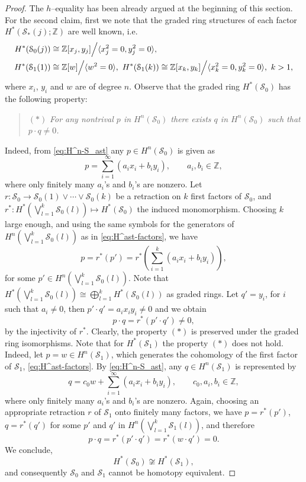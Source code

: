 \documentclass[reqno,12pt]{amsart}
\theoremstyle{ourremark}
\numberwithin{equation}{section}
\numberwithin{theorem}{section}
\begin{document}
\begin{proof}
The $h$--equality has been already argued at the beginning of this section. For the second claim, first we note that the graded ring structures of each factor $H^\ast(\mathcal{S}_\ast(j);{\mathbb{Z}})$ are well known, i.e.
\begin{equation}\label{eq:H^ast-factors}
\begin{split}
 H^\ast(\mathcal{S}_0(j)) & \cong {\mathbb{Z}}[x_j,y_j]\Bigl/\langle x^2_j=0, y^2_j=0\rangle,\\
 H^\ast(\mathcal{S}_1(1)) & \cong {\mathbb{Z}}[w]\Bigl/\langle w^2=0\rangle,\ H^\ast(\mathcal{S}_1(k))  \cong {\mathbb{Z}}[x_k,y_k]\Bigl/\langle x^2_k=0, y^2_k=0\rangle,\ k>1,
\end{split}
\end{equation}
where $x_i$, $y_i$ and $w$ are of degree $n$. Observe that the graded ring $H^\ast(\mathcal{S}_0)$ has the following property: 
\begin{quote}
$(\ast)$ {\em For any nontrival  $p$ in $H^n(\mathcal{S}_0)$  there exists $q$  in $H^n(\mathcal{S}_0)$ such that $p\cdot q\neq 0$.}
\end{quote}
{\noindent} Indeed, from \eqref{eq:H^n-S_ast} any $p\in H^n(\mathcal{S}_0)$ is given as 
\[
 p=\sum^\infty_{i=1} (a_i x_i+b_i y_i),\qquad a_i,b_i\in {\mathbb{Z}},
\]
where only finitely many $a_i$'s and $b_i$'s are nonzero. Let $r:\mathcal{S}_0\longrightarrow \mathcal{S}_0(1)\vee\cdots \vee \mathcal{S}_0(k)$ be a retraction on $k$ first factors of $\mathcal{S}_0$, and $r^\ast:H^\ast(\bigvee^k_{l=1} \mathcal{S}_0(l))\longmapsto H^\ast(\mathcal{S}_0)$ the induced monomorphism. Choosing $k$ large enough, and using the same symbols for the generators of $H^n(\bigvee^k_{l=1} \mathcal{S}_0(l))$ as in \eqref{eq:H^ast-factors}, we have
\[
 p=r^\ast(p')=r^\ast(\sum^k_{i=1} (a_i x_i+b_i y_i)), 
\]
for some $p'\in H^n(\bigvee^k_{l=1} \mathcal{S}_0(l))$. Note that $H^\ast(\bigvee^k_{l=1} \mathcal{S}_0(l))\cong \bigoplus^k_{l=1} H^\ast(\mathcal{S}_0(l))$ as graded rings.
Let $q'=y_i$, for $i$ such that $a_i\neq 0$, then $p'\cdot q'=a_i x_i y_i\neq 0$  and we obtain
\[
p\cdot q=r^\ast(p'\cdot q')\neq 0,
\]
by the injectivity of $r^\ast$. Clearly, the property $(\ast)$ is preserved under the graded ring isomorphisms.
 Note that for $H^\ast(\mathcal{S}_1)$ the property $(\ast)$ does not hold.
Indeed, let $p=w\in H^n(\mathcal{S}_1)$, which generates the cohomology of the first factor of $\mathcal{S}_1$, \eqref{eq:H^ast-factors}. By \eqref{eq:H^n-S_ast}, any $q\in H^n(\mathcal{S}_1)$ is represented by
\[
 q=c_0 w+\sum^\infty_{i=1} (a_i x_i+b_i y_i),\qquad c_0,a_i,b_i\in {\mathbb{Z}},
\]
where only finitely many $a_i$'s and $b_i$'s are nonzero. Again, choosing an appropriate retraction $r$ of $\mathcal{S}_1$ onto finitely many factors,  we have $p=r^\ast(p')$, $q=r^\ast(q')$ for some $p'$ and $q'$ in $H^n(\bigvee^k_{l=1} \mathcal{S}_1(l))$, and therefore 
\[
 p\cdot q=r^\ast(p'\cdot q')=r^\ast(w\cdot q')=0.
\]
We conclude,
\[
 H^\ast(\mathcal{S}_0)\not\cong H^\ast(\mathcal{S}_1),
\]
and consequently $\mathcal{S}_0$ and $\mathcal{S}_1$ cannot be homotopy equivalent. 
\end{proof} 
\end{document}
